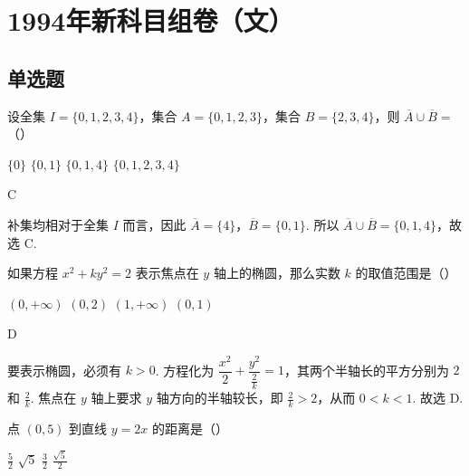\documentclass[UTF8,a4paper,oneside,11pt]{ctexbook}
\begin{document}
\mainmatter

\chapter{1994年新科目组卷（文）}
\section{单选题}

\begin{problem}
设全集 \(I = \{0, 1, 2, 3, 4\}\)，集合 \(A = \{0, 1, 2, 3\}\)，集合 \(B = \{2, 3, 4\}\)，则 \(\overline{A} \cup \overline{B} =\)（\quad）

\choices
    {\(\{0\} \)}
    {\(\{0,1\}\)}
    {\(\{0,1,4\}\)}
    {\(\{0,1,2,3,4\}\)}
\end{problem}

\begin{answer}
C
\end{answer}

\begin{solution}
补集均相对于全集 \(I\) 而言，因此 \(\overline{A}=\{4\}\)，\(\overline{B}=\{0,1\}\). 所以 \(\overline{A}\cup\overline{B}=\{0,1,4\}\)，故选 C.
\end{solution}

\begin{problem}
如果方程 \(x^{2} + ky^{2} = 2\) 表示焦点在 \(y\) 轴上的椭圆，那么实数 \(k\) 的取值范围是（\quad）

\choices
    {\((0, +\infty)\)}
    {\((0,2)\)}
    {\((1, +\infty)\)}
    {\((0,1)\)}
\end{problem}

\begin{answer}
D
\end{answer}

\begin{solution}
要表示椭圆，必须有 \(k>0\). 方程化为 \(\dfrac{x^{2}}{2}+\dfrac{y^{2}}{\frac{2}{k}}=1\)，其两个半轴长的平方分别为 \(2\) 和 \(\frac{2}{k}\). 焦点在 \(y\) 轴上要求 \(y\) 轴方向的半轴较长，即 \(\frac{2}{k}>2\)，从而 \(0<k<1\). 故选 D.
\end{solution}

\begin{problem}
点 \((0,5)\) 到直线 \(y=2x\) 的距离是（\quad）

\choices
    {\(\frac{5}{2}\)}
    {\(\sqrt{5}\)}
    {\(\frac{3}{2}\)}
    {\(\frac{\sqrt{5}}{2}\)}
\end{problem}
\end{document}
